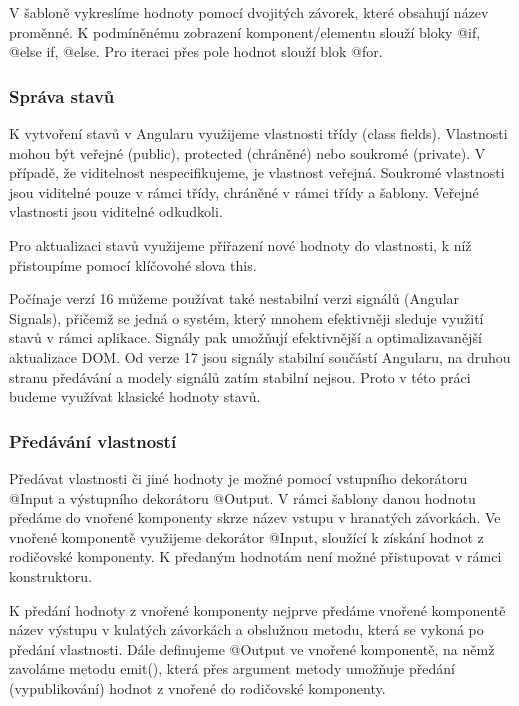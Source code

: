 V šabloně vykreslíme hodnoty pomocí dvojitých závorek, které obsahují název proměnné. K podmíněnému zobrazení komponent/elementu slouží bloky @if, @else if, @else. 
Pro iteraci přes pole hodnot slouží blok @for.\cite{angulardev}

\subsubsection{Správa stavů}

K vytvoření stavů v Angularu využijeme vlastnosti třídy (class fields). Vlastnosti mohou být veřejné (public), protected (chráněné) nebo soukromé (private). 
V případě, že viditelnost nespecifikujeme, je vlastnost veřejná. Soukromé vlastnosti jsou viditelné pouze v rámci třídy, chráněné v rámci třídy a šablony. 
Veřejné vlastnosti jsou viditelné odkudkoli.\cite{angulardev,learningangular}

Pro aktualizaci stavů využijeme přiřazení nové hodnoty do vlastnosti, k níž přistoupíme pomocí klíčovohé slova this.\cite{angulardev}

Počínaje verzí 16 můžeme používat také nestabilní verzi signálů (Angular Signals), přičemž se jedná o systém, který mnohem efektivněji sleduje využití stavů v rámci aplikace. 
Signály pak umožňují efektivnější a optimalizavanější aktualizace DOM. 
Od verze 17 jsou signály stabilní součástí Angularu, na druhou stranu předávání a modely signálů zatím stabilní nejsou. 
Proto v této práci budeme využívat klasické hodnoty stavů.\cite{angulardev}

\subsubsection{Předávání vlastností}

Předávat vlastnosti či jiné hodnoty je možné pomocí vstupního dekorátoru @Input a výstupního dekorátoru @Output. 
V rámci šablony danou hodnotu předáme do vnořené komponenty skrze název vstupu v hranatých závorkách.   
Ve vnořené komponentě využijeme dekorátor @Input, sloužící k získání hodnot z rodičovské komponenty. K předaným hodnotám není možné přistupovat v rámci konstruktoru. 

K předání hodnoty z vnořené komponenty nejprve předáme vnořené komponentě název výstupu v kulatých závorkách a obslužnou metodu, která se vykoná po předání vlastnosti. 
Dále definujeme @Output ve vnořené komponentě, na němž zavoláme metodu emit(), která přes argument metody umožňuje předání (vypublikování) hodnot z vnořené do rodičovské komponenty.\cite{angulardev,learningangular}


